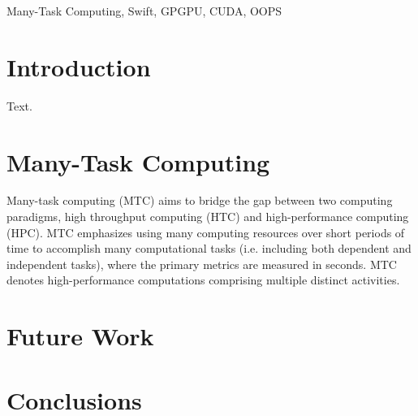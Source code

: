 \documentclass[conference]{IEEEtran}
\begin{document}
\begin{IEEEkeywords}
Many-Task Computing, Swift, GPGPU, CUDA, OOPS
\end{IEEEkeywords}

\IEEEpeerreviewmaketitle

\section{Introduction}

Text. \cite{kriederGCASR12}
\section{Many-Task Computing}
Many-task computing (MTC) aims to bridge the gap between two computing paradigms, high throughput computing (HTC) and high-performance computing (HPC). MTC emphasizes using many computing resources over short periods of time to accomplish many computational tasks (i.e. including both dependent and independent tasks), where the primary metrics are measured in seconds. MTC denotes high-performance computations comprising multiple distinct activities.

\section{Future Work}

\section{Conclusions}



\end{document}
